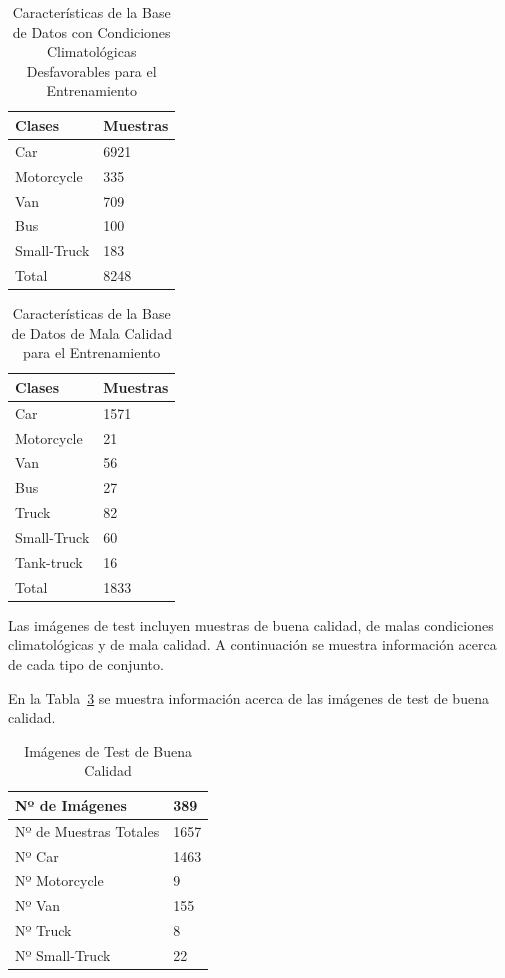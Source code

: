 \begin{table}[H]
\begin{center}
\begin{tabular}{|l|l|}
\hline
Clases & Muestras \\
\hline \hline
Car & 6921 \\ \hline
Motorcycle & 335 \\ \hline
Van & 709 \\ \hline
Bus & 100 \\ \hline
Small-Truck & 183 \\ \hline
Total & 8248 \\ \hline
\end{tabular}
\caption{Características de la Base de Datos con Condiciones Climatológicas Desfavorables para el Entrenamiento}
\label{tabla_redes_database_malas_condiciones}
\end{center}
\end{table}

\begin{table}[H]
\begin{center}
\begin{tabular}{|l|l|}
\hline
Clases & Muestras \\
\hline \hline
Car & 1571 \\ \hline
Motorcycle & 21 \\ \hline
Van & 56 \\ \hline
Bus & 27 \\ \hline
Truck & 82 \\ \hline
Small-Truck & 60 \\ \hline
Tank-truck & 16 \\ \hline
Total & 1833 \\ \hline
\end{tabular}
\caption{Características de la Base de Datos de Mala Calidad para el Entrenamiento}
\label{tabla_redes_database_mala_calidad}
\end{center}
\end{table}

Las imágenes de test incluyen muestras de buena calidad, de malas condiciones climatológicas y de mala calidad. A continuación se muestra información acerca de cada tipo de conjunto.

En la Tabla~\ref{tab_img_test_buenas} se muestra información acerca de las imágenes de test de buena calidad.
\begin{table}[H] 
\begin{center}
\begin{tabular}{|l|l|}
\hline
Nº de Imágenes  & 389 \\
\hline \hline
Nº de Muestras Totales & 1657\\ \hline
Nº Car & 1463 \\ \hline
Nº Motorcycle & 9 \\ \hline
Nº Van & 155 \\ \hline
Nº Truck & 8 \\ \hline
Nº Small-Truck & 22 \\ \hline
\end{tabular}
\caption{Imágenes de Test de Buena Calidad}
\label{tab_img_test_buenas}
\end{center}
\end{table}

